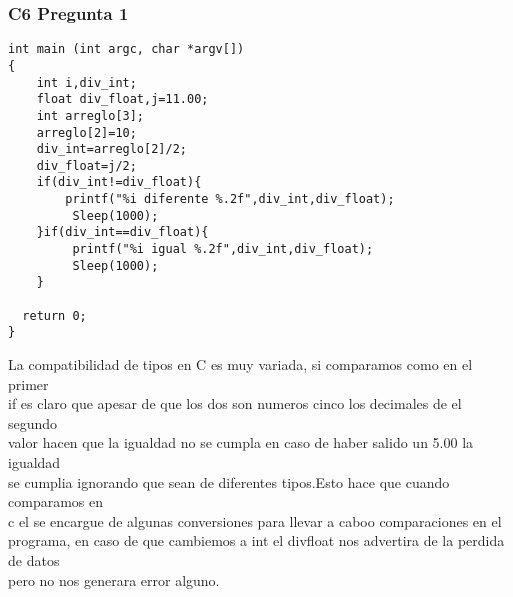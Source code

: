 \subsubsection{C6 Pregunta 1}
\begin{lstlisting}
int main (int argc, char *argv[])
{
	int i,div_int;
	float div_float,j=11.00;
	int arreglo[3];
	arreglo[2]=10;
	div_int=arreglo[2]/2;
	div_float=j/2;
	if(div_int!=div_float){
		printf("%i diferente %.2f",div_int,div_float);
		 Sleep(1000);
	}if(div_int==div_float){
	     printf("%i igual %.2f",div_int,div_float);
		 Sleep(1000);
	}
	
  return 0;
}
 \end{lstlisting}
La compatibilidad de tipos en C es muy variada, si comparamos como en el primer \\
if es claro que apesar de que los dos son numeros cinco los decimales de el segundo\\
valor hacen que la igualdad no se cumpla en caso de haber salido un 5.00 la igualdad \\
se cumplia ignorando que sean de diferentes tipos.Esto hace que cuando comparamos en \\
c el se encargue de algunas conversiones para llevar a caboo comparaciones en el \\
programa, en caso de que cambiemos a int el divfloat nos advertira de la perdida de datos \\
pero no nos generara error alguno.
  